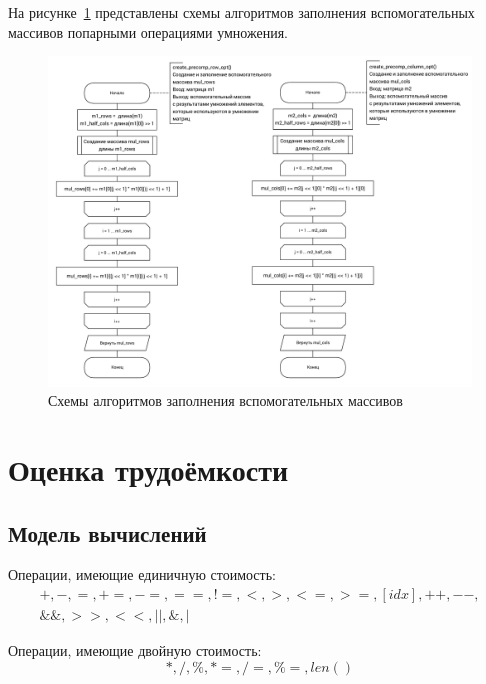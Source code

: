 На рисунке~\ref{fig:winograd_opt_scheme_3} представлены схемы алгоритмов заполнения вспомогательных массивов попарными операциями умножения.

\begin{figure}[H]
\centering
\includegraphics[width=\textwidth]{inc/img/winograd_opt_3.pdf}
\caption{Схемы алгоритмов заполнения вспомогательных массивов}
\label{fig:winograd_opt_scheme_3}
\end{figure}

\section{Оценка трудоёмкости}

\subsection{Модель вычислений}\label{sub:model}

Операции, имеющие единичную стоимость:
\begin{equation}
    \begin{gathered}
        +, -, =, +=, -=, ==, !=, <, >, <=, >=, [idx], ++, {-}-,\\
        \&\&, >>, <<, ||, \&, |
    \end{gathered}
\end{equation}

Операции, имеющие двойную стоимость:
\begin{equation}
    *, /, \%, *=, /=, \%=, len()
\end{equation}

